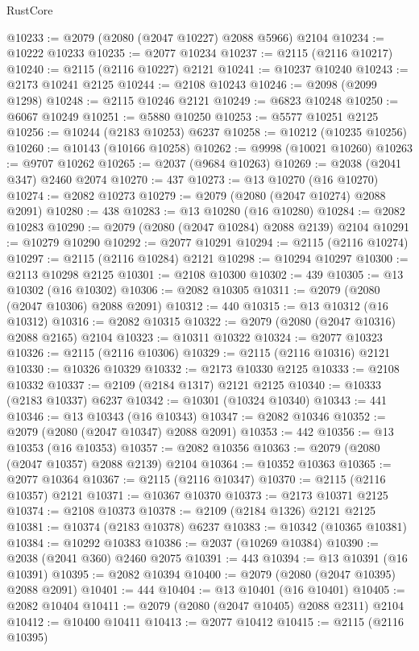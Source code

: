 \begin{lexlean}{RustCore}
\begin{coremodule}
@10233 := @2079 (@2080 (@2047 @10227) @2088 @5966) @2104
@10234 := @10222 @10233
@10235 := @2077 @10234
@10237 := @2115 (@2116 @10217)
@10240 := @2115 (@2116 @10227) @2121
@10241 := @10237 @10240
@10243 := @2173 @10241 @2125
@10244 := @2108 @10243
@10246 := @2098 (@2099 @1298)
@10248 := @2115 @10246 @2121
@10249 := @6823 @10248
@10250 := @6067 @10249
@10251 := @5880 @10250
@10253 := @5577 @10251 @2125
@10256 := @10244 (@2183 @10253) @6237
@10258 := @10212 (@10235 @10256)
@10260 := @10143 (@10166 @10258)
@10262 := @9998 (@10021 @10260)
@10263 := @9707 @10262
@10265 := @2037 (@9684 @10263)
@10269 := @2038 (@2041 @347) @2460 @2074
@10270 := 437
@10273 := @13 @10270 (@16 @10270)
@10274 := @2082 @10273
@10279 := @2079 (@2080 (@2047 @10274) @2088 @2091)
@10280 := 438
@10283 := @13 @10280 (@16 @10280)
@10284 := @2082 @10283
@10290 := @2079 (@2080 (@2047 @10284) @2088 @2139) @2104
@10291 := @10279 @10290
@10292 := @2077 @10291
@10294 := @2115 (@2116 @10274)
@10297 := @2115 (@2116 @10284) @2121
@10298 := @10294 @10297
@10300 := @2113 @10298 @2125
@10301 := @2108 @10300
@10302 := 439
@10305 := @13 @10302 (@16 @10302)
@10306 := @2082 @10305
@10311 := @2079 (@2080 (@2047 @10306) @2088 @2091)
@10312 := 440
@10315 := @13 @10312 (@16 @10312)
@10316 := @2082 @10315
@10322 := @2079 (@2080 (@2047 @10316) @2088 @2165) @2104
@10323 := @10311 @10322
@10324 := @2077 @10323
@10326 := @2115 (@2116 @10306)
@10329 := @2115 (@2116 @10316) @2121
@10330 := @10326 @10329
@10332 := @2173 @10330 @2125
@10333 := @2108 @10332
@10337 := @2109 (@2184 @1317) @2121 @2125
@10340 := @10333 (@2183 @10337) @6237
@10342 := @10301 (@10324 @10340)
@10343 := 441
@10346 := @13 @10343 (@16 @10343)
@10347 := @2082 @10346
@10352 := @2079 (@2080 (@2047 @10347) @2088 @2091)
@10353 := 442
@10356 := @13 @10353 (@16 @10353)
@10357 := @2082 @10356
@10363 := @2079 (@2080 (@2047 @10357) @2088 @2139) @2104
@10364 := @10352 @10363
@10365 := @2077 @10364
@10367 := @2115 (@2116 @10347)
@10370 := @2115 (@2116 @10357) @2121
@10371 := @10367 @10370
@10373 := @2173 @10371 @2125
@10374 := @2108 @10373
@10378 := @2109 (@2184 @1326) @2121 @2125
@10381 := @10374 (@2183 @10378) @6237
@10383 := @10342 (@10365 @10381)
@10384 := @10292 @10383
@10386 := @2037 (@10269 @10384)
@10390 := @2038 (@2041 @360) @2460 @2075
@10391 := 443
@10394 := @13 @10391 (@16 @10391)
@10395 := @2082 @10394
@10400 := @2079 (@2080 (@2047 @10395) @2088 @2091)
@10401 := 444
@10404 := @13 @10401 (@16 @10401)
@10405 := @2082 @10404
@10411 := @2079 (@2080 (@2047 @10405) @2088 @2311) @2104
@10412 := @10400 @10411
@10413 := @2077 @10412
@10415 := @2115 (@2116 @10395)

\end{coremodule}
\end{lexlean}
